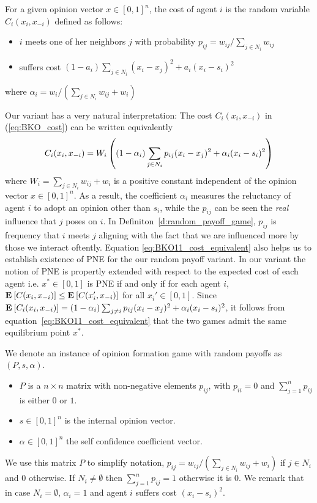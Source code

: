\begin{definition}\label{d:random_payoff_game}
  For a given opinion vector $x \in [0,1]^n$, the cost of agent $i$
  is the random variable $C_i(x_i,x_{-i})$ defined as follows:
  \begin{itemize}
    \item $i$ meets one of her neighbors $j$ with probability $p_{ij}= w_{ij}/\sum_{j\in N_i}w_{ij}$
    \item suffers cost $(1-a_i)\sum_{j \in N_i}(x_i-x_j)^2 + a_i(x_i-s_i)^2$
  \end{itemize}
  where $\alpha_i = w_i/(\sum_{j\in N_i}w_{ij}+w_i)$
\end{definition}
\noindent Our variant has a very natural interpretation: The cost $C_i(x_i,x_{-i})$ in (\ref{eq:BKO_cost})
can be written equivalently 
\begin{equation}\label{eq:BKO11_cost_equivalent}
C_i(x_i,x_{-i}) = W_i\left( (1-\alpha_i)\sum_{j \in N_i} p_{ij}(x_i-x_j)^2  + \alpha_i(x_i-s_i)^2\right)
\end{equation}
where $W_i=\sum_{j\in N_i}w_{ij} + w_i$ is a positive constant independent of the opinion vector $x\in [0,1]^n$. As a result, the coefficient $\alpha_i$
measures the reluctancy of agent $i$ to adopt an opinion other than $s_i$, while the $p_{ij}$ can be seen the \emph{real} influence that $j$ poses on $i$.
In Definiton~\ref{d:random_payoff_game}, $p_{ij}$ is frequency that $i$ meets $j$ aligning with the fact that we are influenced more by those we interact
oftently. Equation \ref{eq:BKO11_cost_equivalent} also helps us to establish existence of PNE for the our random payoff variant. 
In our variant the notion of PNE is propertly extended with respect to the expected cost of each agent i.e. $x^* \in [0,1]$ is PNE if and only if
for each agent $i$, $\Exp{C(x_i, x_{-i})} \leq \Exp{C(x_i', x_{-i})}$ for all $x_i' \in [0,1]$. Since 
$\bm{\mathrm{E}}_{} \left[ C_i(x_i,x_{-i}) \right]=(1-\alpha_i)\sum_{j \neq i}p_{ij}(x_i-x_j)^2 + \alpha_i(x_i-s_i)^2$, it follows
from equation~\ref{eq:BKO11_cost_equivalent} that the two games admit the same equilibrium point $x^*$. 

\begin{definition}\label{d:random_payof_game_instance}
We denote an instance of opinion formation game with random payoffs as $(P,s,\alpha)$.
\begin{itemize}
 \item $P$ is a $n \times n$  matrix with non-negative elements $p_{ij}$,
  with $p_{ii}=0$ and $\sum_{j=1}^n p_{ij}$ is either $0$ or $1$.
 \item $s \in [0,1]^n$ is the internal opinion vector.
 \item $\alpha \in [0,1]^n$ the self confidence coefficient vector.
 \end{itemize}
\end{definition}
We use this matrix $P$ to simplify notation, $p_{ij} = w_{ij}/(\sum_{j \in N_i}w_{ij}+w_i)$ if $j \in N_i$ and $0$ otherwise.
If $N_i \neq \emptyset$ then $\sum_{j=1}^n p_{ij}=1$ otherwise it is $0$. We remark that in case $N_i=\emptyset$, $\alpha_i=1$ 
and agent $i$ suffers cost $(x_i-s_i)^2$.

